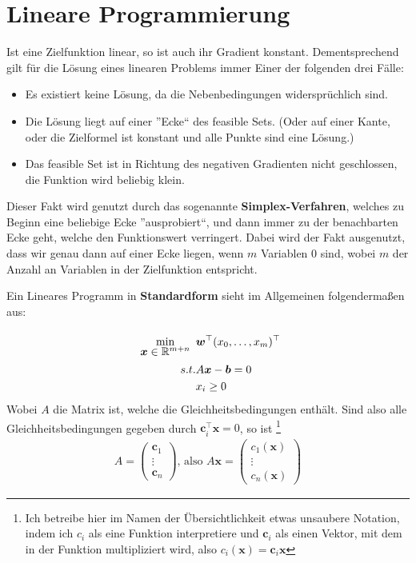 \documentclass{report}
\newcommand{\tbf}{\textbf}
\renewcommand{\min}[1] {
    \begin{array}{c}
        \vphantom{#1}\\[-3pt] %
        \text{min}\\[-3pt]
        #1\\
        \end{array}
    }
\newcommand*{\newpar}{\par\vspace{\baselineskip}\noindent}
\begin{document}
\chapter{Lineare Programmierung}
Ist eine Zielfunktion linear, so ist auch ihr Gradient konstant. Dementsprechend gilt für die Lösung eines linearen Problems immer Einer der folgenden drei Fälle:
\begin{itemize}
 \item Es existiert keine Lösung, da die Nebenbedingungen widersprüchlich sind.
 \item Die Lösung liegt auf einer ''Ecke`` des feasible Sets. (Oder auf einer Kante, oder die Zielformel ist konstant und alle Punkte sind eine Lösung.)
  \item Das feasible Set ist in Richtung des negativen Gradienten nicht geschlossen, die Funktion wird beliebig klein.
\end{itemize}
Dieser Fakt wird genutzt durch das sogenannte \tbf{Simplex-Verfahren}, welches zu Beginn eine beliebige Ecke ''ausprobiert``, und dann immer zu der benachbarten Ecke geht, welche den Funktionswert verringert. Dabei wird der Fakt ausgenutzt, dass wir genau dann auf einer Ecke liegen, wenn $m$ Variablen $0$ sind, wobei $m$ der Anzahl an Variablen in der Zielfunktion entspricht.
\newpar
Ein Lineares Programm in \tbf{Standardform} sieht im Allgemeinen folgendermaßen aus:
\begin{align*}
  \min{\bm{x} \in \mathbb{R}^{m+n}}&\bm{w}^\top (x_0, \hdots, x_m)^\top\\
  s.t. & A\bm{x} - \bm{b}= 0\\
  &x_i \geq 0\\
\end{align*}
Wobei $A$ die Matrix ist, welche die Gleichheitsbedingungen enthält. Sind also alle Gleichheitsbedingungen gegeben durch $\bm{c}_i^\top \bm{x} = 0$, so ist \footnote{Ich betreibe hier im Namen der Übersichtlichkeit etwas unsaubere Notation, indem ich $c_i$ als eine Funktion interpretiere und $\bm{c}_i$ als einen Vektor, mit dem in der Funktion multipliziert wird, also $c_i(\bm{x}) = \bm{c}_i \bm{x}$}
\begin{align*}
A =
\begin{pmatrix}
\bm{c}_1\\
\vdots\\
\bm{c}_n
\end{pmatrix}
\text{, also }
A \bm{x} =
\begin{pmatrix}
c_1(\bm{x})\\
\vdots\\
c_n(\bm{x})
\end{pmatrix}
\end{align*}
\end{document}
